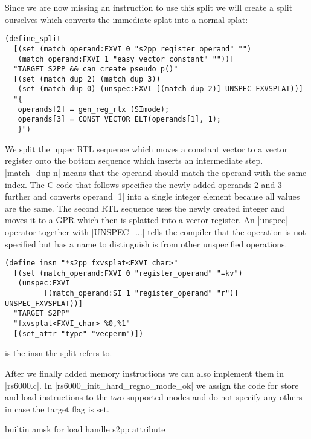 Since we are now missing an instruction to use this split we will create a split ourselves which converts the immediate splat into a normal splat:
\begin{lstlisting}
(define_split
  [(set (match_operand:FXVI 0 "s2pp_register_operand" "")
   (match_operand:FXVI 1 "easy_vector_constant" ""))]
  "TARGET_S2PP && can_create_pseudo_p()"
  [(set (match_dup 2) (match_dup 3))
   (set (match_dup 0) (unspec:FXVI [(match_dup 2)] UNSPEC_FXVSPLAT))]
  "{
   operands[2] = gen_reg_rtx (SImode);
   operands[3] = CONST_VECTOR_ELT(operands[1], 1);
   }")
\end{lstlisting}

We split the upper RTL sequence which moves a constant vector to a vector register onto the bottom sequence which inserts an intermediate step.
|match_dup n| means that the operand should match the operand with the same index.
The C code that follows specifies the newly added operands 2 and 3 further and converts operand |1| into a single integer element because all values are the same.
The second RTL sequence uses the newly created integer and moves it to a GPR which then is splatted into a vector register.
An |unspec| operator together with |UNSPEC_...| tells the compiler that the operation is not specified but has a name to distinguish is from other unspecified operations.

\begin{lstlisting}
(define_insn "*s2pp_fxvsplat<FXVI_char>"
  [(set (match_operand:FXVI 0 "register_operand" "=kv")
   (unspec:FXVI
         [(match_operand:SI 1 "register_operand" "r")] UNSPEC_FXVSPLAT))]
  "TARGET_S2PP"
  "fxvsplat<FXVI_char> %0,%1"
  [(set_attr "type" "vecperm")])
\end{lstlisting}
is the insn the split refers to.

After we finally added memory instructions we can also implement them in |rs6000.c|.
In |rs6000_init_hard_regno_mode_ok| we assign the code for store and load instructions to the two supported modes and do not specify any others in case the target flag is set.





builtin amsk for load
handle s2pp attribute




